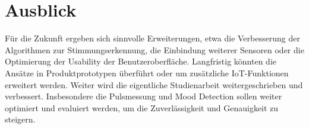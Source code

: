 \chapter{Ausblick}
Für die Zukunft ergeben sich sinnvolle Erweiterungen, etwa die Verbesserung der Algorithmen zur Stimmungserkennung, die Einbindung weiterer Sensoren oder die Optimierung der Usability der Benutzeroberfläche. Langfristig könnten die Ansätze in Produktprototypen überführt oder um zusätzliche IoT-Funktionen erweitert werden. Weiter wird die eigentliche Studienarbeit weitergeschrieben und verbessert. Insbesondere die Pulsmessung und Mood Detection sollen weiter optimiert und evaluiert werden, um die Zuverlässigkeit und Genauigkeit zu steigern.